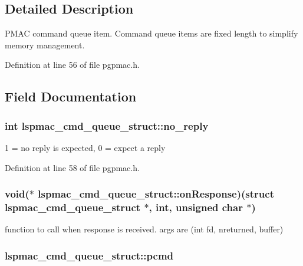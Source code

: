 \subsection{Detailed Description}
PMAC command queue item. Command queue items are fixed length to simplify memory management. 

Definition at line 56 of file pgpmac.h.

\subsection{Field Documentation}
\hypertarget{structlspmac__cmd__queue__struct_a33f70b45f8b7c27935cd3efe28748479}{
\subsubsection[{no\_\-reply}]{\setlength{\rightskip}{0pt plus 5cm}int {\bf lspmac\_\-cmd\_\-queue\_\-struct::no\_\-reply}}}
\label{structlspmac__cmd__queue__struct_a33f70b45f8b7c27935cd3efe28748479}


1 = no reply is expected, 0 = expect a reply 

Definition at line 58 of file pgpmac.h.\hypertarget{structlspmac__cmd__queue__struct_afe92c0bab9f124314a6f3d8104c94364}{
\subsubsection[{onResponse}]{\setlength{\rightskip}{0pt plus 5cm}void($\ast$ {\bf lspmac\_\-cmd\_\-queue\_\-struct::onResponse})(struct {\bf lspmac\_\-cmd\_\-queue\_\-struct} $\ast$, int, unsigned char $\ast$)}}
\label{structlspmac__cmd__queue__struct_afe92c0bab9f124314a6f3d8104c94364}


function to call when response is received. args are (int fd, nreturned, buffer) \hypertarget{structlspmac__cmd__queue__struct_a9ac7618bbe0faa3001e8efeb1d89010d}{
\subsubsection[{pcmd}]{ {\bf lspmac\_\-cmd\_\-queue\_\-struct::pcmd}}}
\label{structlspmac__cmd__queue__struct_a9ac7618bbe0faa3001e8efeb1d89010d}


